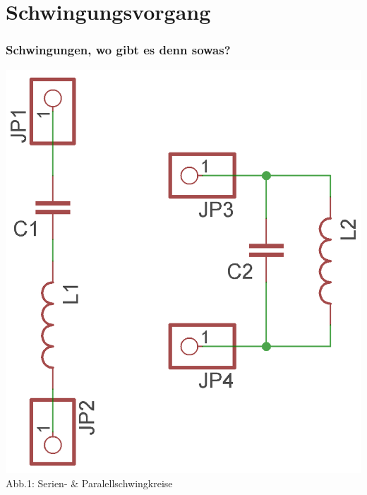 

\subtitle{Technik Klasse E 07: \\
          Schwingkreise \& Filter \\[2em]}
\date{Stand 20.11.2014}


\section*{Schwingungsvorgang}
\begin{frame}
\frametitle{Schwingungen, wo gibt es denn sowas?}
	\begin{center}
		\includegraphics[scale=1.4]{e07/Schwingkreise.png}\\
		Abb.1: Serien- \& Paralellschwingkreise
	\end{center}
\end{frame}

